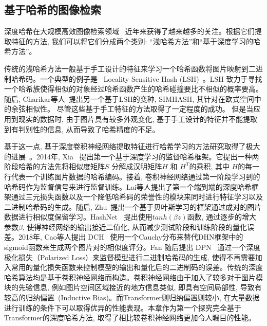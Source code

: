 \subsection{基于哈希的图像检索}
深度哈希在大规模高效图像检索领域~\cite{chen2021dvhn, ge2013optimized, gong2012iterative, heo2012spherical} \cite{indyk1997locality, yu2018product, weiss2008spectral}近年来获得了越来越多的关注。根据它们提取特征的方法, 我们可以将它们分成两个类别: ``浅哈希方法''和``基于深度学习的哈希方法''。 \par
传统的浅哈希方法一般基于手工设计的特征来学习一个哈希函数将图片映射到二进制哈希码。一个典型的例子是~ Locality Sensitive Hash (LSH)~\cite{indyk1997locality}。LSH 致力于寻找一个哈希族使得相似的对象经过哈希函数产生的哈希碰撞要比不相似的概率要高。随后, Charikar等人~\cite{charikar2002similarity}提出另一个基于LSH的变种, SIMHASH, 其针对在欧式空间中的余弦相似性。 尽管这些基于手工特征的方法取得了一定程度的成功。 但是当应用到现实的数据时, 由于图片具有较多外观变化, 基于手工设计的特征并不能提取到有判别性的信息, 从而导致了哈希精度的不足。\par
基于这一点, 基于深度卷积神经网络提取特征进行哈希学习的方法研究取得了极大的进展~\cite{cao2017hashnet, fan20deep, li2015feature, liu2016deep, zhu2016deep}。2014年, Xia~\cite{xia2014supervised} 提出第一个基于深度学习的监督哈希框架。它提出一种两阶段哈希的方法先将相似度矩阵$S$ 分解成汉明矩阵$H$ 和 $H^T$的乘积, 其中 $H$的每一行代表一个训练图片数据的哈希编码。接着, 卷积神经网络通过第一阶段学习到的哈希码作为监督信号来进行监督训练。Lai等人提出了第一个端到端的深度哈希框架通过三元损失函数以及一个降低哈希码的荣誉性的模块来同时进行特征学习以及二进制哈希码的生成。随后, Zhu~\cite{liu2016deep}提出一个基于贝叶斯学习的框架通过成对的图片数据进行相似度保留学习。HashNet~\cite{cao2017hashnet} 提出使用$tanh(\beta z)$函数, 通过逐步的增大参数$\beta$, 使得神经网络的输出接近二值化, 从而减少测试阶段和训练阶段的量化误差。2018年, Cao等人提出 DCH~\cite{cao2018deep} 使用一个Cauchy分布来替代DHN框架中的sigmoid函数来生成两个图片对的相似度评分。Fan 随后提出 DPN~\cite{fan2020deep} 通过一个深度极化损失（Polarized Loss）来监督模型进行二进制哈希码的生成, 使得不再需要加入常用的量化损失函数来控制模型的输出和量化后的二进制码的误差。传统的深度哈希算法均是基于卷积神经网络而构造。卷积神经网络由于加入了较多对于图片模块的先验信息, 例如图片空间区域接近的地方信息类似, 即具有空间局部性, 导致有较高的归纳偏置~(Inductive Bias)。而Transformer则归纳偏置则较小, 在大量数据进行训练的条件下可以取得优异的性能表现。本章作为第一个探究完全基于Transformer的深度哈希方法, 取得了相比较卷积神经网络更加令人瞩目的性能。

